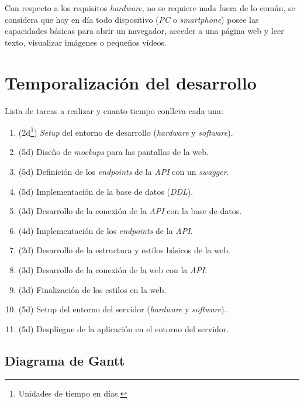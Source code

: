 \documentclass[12pt,a4paper,titlepage]{article}
\begin{document}
    Con respecto a los requisitos \textit{hardware}, no se requiere nada fuera de lo común, se considera que hoy en día todo dispositivo (\textit{PC} o \textit{smartphone}) posee las capacidades básicas para abrir un navegador, acceder a una página web y leer texto, visualizar imágenes o pequeños vídeos.

    \section{Temporalización del desarrollo}



    Lista de tareas a realizar y cuanto tiempo conlleva cada una:

    \begin{enumerate}
        \item (2d\footnote{Unidades de tiempo en días.}) \textit{Setup} del entorno de desarrollo (\textit{hardware} y \textit{software}).
        \item (5d) Diseño de \textit{mockups} para las pantallas de la web.
        \item (5d) Definición de los \textit{endpoints} de la \textit{API} con un \textit{swagger}.
        \item (5d) Implementación de la base de datos (\textit{DDL}).
        \item (3d) Desarrollo de la conexión de la \textit{API} con la base de datos.
        \item (4d) Implementación de los \textit{endpoints} de la \textit{API}.
        \item (2d) Desarrollo de la estructura y estilos básicos de la web.
        \item (3d) Desarrollo de la conexión de la web con la \textit{API}.
        \item (3d) Finalización de los estilos en la web.
        \item (5d) Setup del entorno del servidor (\textit{hardware} y \textit{software}).
        \item (5d) Despliegue de la aplicación en el entorno del servidor.
    \end{enumerate}

    \subsection{Diagrama de Gantt}
\end{document}
